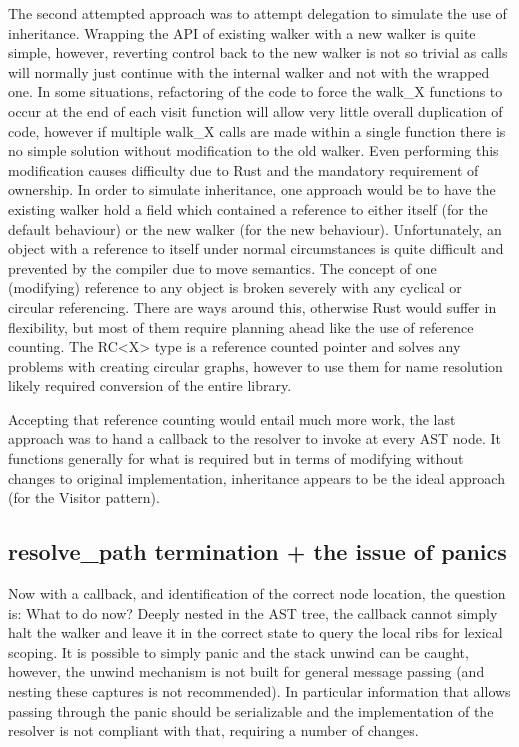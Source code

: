 The second attempted approach was to attempt delegation to simulate the use of inheritance. Wrapping the API of existing walker with a new walker is quite simple, however, reverting control back to the new walker is not so trivial as calls will normally just continue with the internal walker and not with the wrapped one. In some situations, refactoring of the code to force the walk\_X functions to occur at the end of each visit function will allow very little overall duplication of code, however if multiple walk\_X calls are made within a single function there is no simple solution without modification to the old walker. Even performing this modification causes difficulty due to Rust and the mandatory requirement of ownership. In order to simulate inheritance, one approach would be to have the existing walker hold a field which contained a reference to either itself (for the default behaviour) or the new walker (for the new behaviour). Unfortunately, an object with a reference to itself under normal circumstances is quite difficult and prevented by the compiler due to move semantics. The concept of one (modifying) reference to any object is broken severely with any cyclical or circular referencing. There are ways around this, otherwise Rust would suffer in flexibility, but most of them require planning ahead like the use of reference counting. The RC<X> type is a reference counted pointer and solves any problems with creating circular graphs, however to use them for name resolution likely required conversion of the entire library.

Accepting that reference counting would entail much more work, the last approach was to hand a callback to the resolver to invoke at every AST node. It functions generally for what is required but in terms of modifying without changes to original implementation, inheritance appears to be the ideal approach (for the Visitor pattern).

\subsection{resolve\_path termination + the issue of panics}
Now with a callback, and identification of the correct node location, the question is: What to do now? Deeply nested in the AST tree, the callback cannot simply halt the walker and leave it in the correct state to query the local ribs for lexical scoping. It is possible to simply panic and the stack unwind can be caught, however, the unwind mechanism is not built for general message passing (and nesting these captures is not recommended). In particular information that allows passing through the panic should be serializable and the implementation of the resolver is not compliant with that, requiring a number of changes. 

